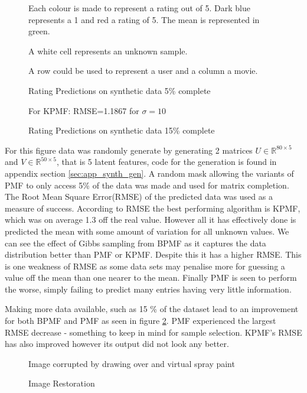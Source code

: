 \begin{figure}[!htbp]
  \begin{center}
    \resizebox{\textwidth}{!}{}
    Each colour is made to represent a rating out of 5. Dark blue represents a 1 and red a rating of 5. The mean is represented in green.

    A white cell represents an unknown sample.
    
    A row could be used to represent a user and a column a movie.
    \caption{Rating Predictions on synthetic data 5\% complete}
     \label{fig:5pcmat}
  \end{center}
\end{figure}
\begin{figure}[!htbp]
  \begin{center} 
    \resizebox{\textwidth}{!}{}
    For KPMF: RMSE=1.1867 for $\sigma=10$
    
    
    \caption{Rating Predictions on synthetic data 15\% complete}
    \label{fig:15pcmat}
  \end{center}
\end{figure}
For this figure data was randomly generate by generating 2 matrices $U \in \mathbb{R}^{80\times 5}$ and $V \in \mathbb{R}^{50\times 5}$, that is 5 latent features, code for the generation is found in appendix section \ref{sec:app_synth_gen}. A  random mask allowing the variants of PMF to only access 5\% of the data was made and used for matrix completion. The Root Mean Square Error(RMSE) of the predicted data was used as a measure of success. According to RMSE the best performing algorithm is KPMF, which was on average 1.3 off the real value. However all it has effectively done is predicted the mean with some amount of variation for all unknown values. We can see the effect of Gibbs sampling from BPMF as it captures the data distribution better than PMF or KPMF. Despite this it has a higher RMSE. This is one weakness of RMSE as some data sets may penalise more for guessing a value off the mean than one nearer to the mean. Finally PMF is seen to perform the worse, simply failing to predict many entries having very little information.

Making more data available, such as 15 \% of the dataset lead to an improvement for both BPMF and PMF as seen in figure \ref{fig:15pcmat}. PMF experienced the largest RMSE decrease -  something to keep in mind for sample selection. KPMF's RMSE has also improved however its output did not look any better.
\begin{figure}[!htbp]
  \begin{center}
    \resizebox{\textwidth}{!}{}
    Image corrupted by drawing over and virtual spray paint
    \caption{Image Restoration}
    \label{fig:eiffel_tower}
  \end{center}
\end{figure}

